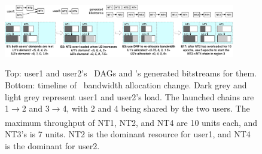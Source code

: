 {
\begin{figure}
\begin{center}
\centerline{\includegraphics[width=0.9\textwidth]{Figures/nt-example.pdf}}
\vspace{-0.1in}
{
Top: user1 and user2's \nt\ DAGs and \snic's generated bitstreams for them.
Bottom: timeline of \nt\ bandwidth allocation change.
Dark grey and light grey represent user1 and user2's load.
The launched chains are \nt{}1$\xrightarrow[]{}$\nt{}2 and \nt{}3$\xrightarrow[]{}$\nt{}4,
with \nt{}2 and \nt{}4 being shared by the two users.
The maximum throughput of NT1, NT2, and NT4 are 10 units each, and NT3's is 7 units.
NT2 is the dominant resource for user1, and NT4 is the dominant for user2.
}
\end{center}
\vspace{-0.2in}
\end{figure}
}

